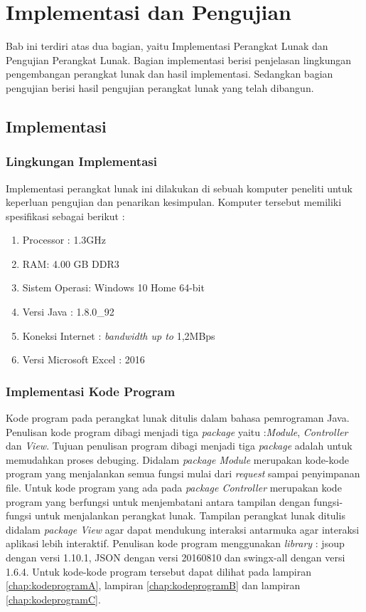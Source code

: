 \chapter{Implementasi dan Pengujian}
\label{chap:implementasidanpengujian}

Bab ini terdiri atas dua bagian, yaitu Implementasi Perangkat Lunak dan Pengujian Perangkat Lunak. Bagian implementasi berisi penjelasan lingkungan pengembangan perangkat lunak dan hasil implementasi. Sedangkan bagian pengujian berisi hasil pengujian perangkat lunak yang telah dibangun.

\section{Implementasi}
\label{sec:implementasi}

\subsection{Lingkungan Implementasi}
\label{subsec:lingkunganimplementasi}

Implementasi perangkat lunak ini dilakukan di sebuah komputer peneliti untuk keperluan pengujian dan penarikan kesimpulan. Komputer tersebut memiliki spesifikasi sebagai berikut :

\begin{enumerate}
	\item Processor : 1.3GHz
	\item RAM: 4.00 GB DDR3
	\item Sistem Operasi: Windows 10 Home 64-bit
	\item Versi Java : 1.8.0\_92
	\item Koneksi Internet : \textit{bandwidth up to} 1,2MBps
	\item Versi Microsoft Excel : 2016
\end{enumerate}

\subsection{Implementasi Kode Program}
\label{subsec:implementasikodeprogram}

Kode program pada perangkat lunak ditulis dalam bahasa pemrograman Java. Penulisan kode program dibagi menjadi tiga \textit{package} yaitu :\textit{Module}, \textit{Controller} dan \textit{View}. Tujuan penulisan program dibagi menjadi tiga \textit{package} adalah untuk memudahkan proses debuging. Didalam \textit{package Module} merupakan kode-kode program yang menjalankan semua fungsi mulai dari \textit{request} sampai penyimpanan file. Untuk kode program yang ada pada \textit{package Controller} merupakan kode program yang berfungsi untuk menjembatani antara tampilan dengan fungsi-fungsi untuk menjalankan perangkat lunak. Tampilan perangkat lunak ditulis didalam \textit{package View} agar dapat mendukung interaksi antarmuka agar interaksi aplikasi lebih interaktif. Penulisan kode program menggunakan \textit{library} : jsoup dengan versi 1.10.1, JSON dengan versi 20160810 dan swingx-all dengan versi 1.6.4. Untuk kode-kode program tersebut dapat dilihat pada lampiran \ref{chap:kodeprogramA}, lampiran \ref{chap:kodeprogramB} dan lampiran \ref{chap:kodeprogramC}.

